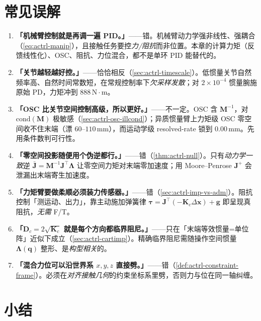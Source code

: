 \section{常见误解}
\label{sec:actrl-misconceptions}

\begin{enumerate}
  \item \textbf{「机械臂控制就是再调一遍 PID。」}——错。机械臂动力学强非线性、强耦合（\cref{eq:actrl-manip}），且接触任务要控\emph{力/阻抗}而非位置。本章的计算力矩（反馈线性化）、OSC、阻抗、力位混合，都不是单环 PID 能替代的。
  \item \textbf{「关节越轻越好控。」}——恰恰相反（\cref{sec:actrl-timescale}）。低惯量关节自然频率高、自然时间常数短，在常规控制率下\emph{欠采样发散}；对 $2\times10^{-4}$ 惯量腕施原始 PD，力矩冲到 $888\,\mathrm{N\!\cdot\!m}$。
  \item \textbf{「OSC 比关节空间控制高级，所以更好。」}——不一定。OSC 含 $\mathbf{M}^{-1}$，对 $\mathrm{cond}(\mathbf{M})$ 极敏感（\cref{sec:actrl-osc-illcond}）；异质惯量臂上力矩级 OSC 零空间收不住末端（漂 $60$--$110\,\mathrm{mm}$），而运动学级 resolved-rate 锁到 $0.00\,\mathrm{mm}$。先用条件数判可行性。
  \item \textbf{「零空间投影随便用个伪逆都行。」}——错（\cref{thm:actrl-null}）。只有\emph{动力学一致}逆 $\bar{\mathbf{J}}=\mathbf{M}^{-1}\mathbf{J}^\top\boldsymbol{\Lambda}$ 让零空间力矩对末端零加速度；用 Moore--Penrose $\mathbf{J}^+$ 会泄漏出末端寄生加速度。
  \item \textbf{「力矩臂要做柔顺必须装力传感器。」}——错（\cref{sec:actrl-imp-vs-adm}）。阻抗控制「测运动、出力」，靠主动施加弹簧律 $\boldsymbol{\tau}=\mathbf{J}^\top(-\mathbf{K}_c\Delta\mathbf{x})+\mathbf{g}$ 即呈现真阻抗，\emph{无需} F/T。
  \item \textbf{「$\mathbf{D}_c=2\sqrt{\mathbf{K}_c}$ 就是每个方向都临界阻尼。」}——只在「末端等效惯量=单位阵」近似下成立（\cref{sec:actrl-cartimp}）。精确临界阻尼需随操作空间惯量 $\boldsymbol{\Lambda}(\mathbf{q})$ 整形、是\emph{构型相关}的。
  \item \textbf{「混合力位可以沿世界系 $x,y,z$ 直接劈。」}——错（\cref{def:actrl-constraint-frame}）。必须在\emph{对齐接触几何}的约束坐标系里劈，否则力与位在同一轴纠缠。
\end{enumerate}

\section{小结}
\label{sec:actrl-summary}

